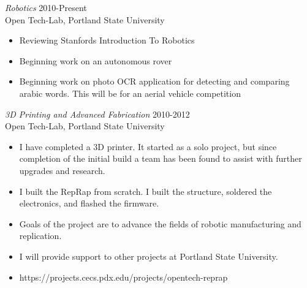 \documentclass[margin]{res}
\begin{document}
\begin{resume}
				{\sl Robotics} \hfill 2010-Present \\
                Open Tech-Lab, Portland State University
				\begin{itemize}  \itemsep -2pt %
					\item   Reviewing Stanfords Introduction To Robotics
					\item	Beginning work on an autonomous rover
					\item   Beginning work on photo OCR application
							for detecting and comparing arabic words.  This 
							will be for an aerial vehicle competition
				\end{itemize}	
				{\sl 3D Printing and Advanced Fabrication} \hfill 2010-2012 \\
                Open Tech-Lab, Portland State University
				\begin{itemize}  \itemsep -2pt %
					\item   I have completed a 3D printer. It started as a solo project, 
							but since completion of the initial build a team has been found to
							assist with further upgrades and research.
					\item   I built the RepRap from scratch.  I built the structure, soldered 
							the electronics, and flashed the firmware.
					\item  	Goals of the project are to advance the fields of 
					 		robotic manufacturing and replication.
					\item	I will provide support to other projects at Portland State University.
					\item   https://projects.cecs.pdx.edu/projects/opentech-reprap
				\end{itemize}					
 				
\end{resume}
\end{document}
